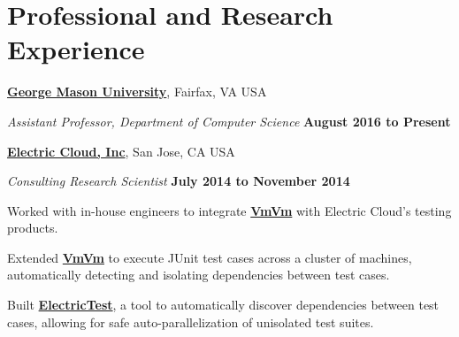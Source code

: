 \documentclass[10pt]{article}
\begin{document}
\begin{outerlist}
\end{outerlist}



\section{Professional and Research Experience}

\href{http://cs.gmu.edu/}{\textbf{George Mason University}},
Fairfax, VA USA
\begin{outerlist}
\item[] \textit{Assistant Professor, Department of Computer Science}%
    \hfill \textbf{August 2016 to Present}

\end{outerlist}

\halfblankline


\href{http://www.electric-cloud.com/}{\textbf{Electric Cloud, Inc}},
San Jose, CA USA
\begin{outerlist}
\item[] \textit{Consulting Research Scientist}%
    \hfill \textbf{July 2014 to November 2014}%
    \begin{innerlist}
    \item Worked with in-house engineers to integrate \href{http://jonbell.net/publications/vmvm}{\textbf{VmVm}} with Electric Cloud's testing products.
           \item Extended  \href{http://jonbell.net/publications/vmvm}{\textbf{VmVm}} to execute JUnit test cases across a cluster of machines, automatically detecting and isolating dependencies between test cases.
            \item Built  \href{http://jonbell.net/publications/electrictest}{\textbf{ElectricTest}}, a tool to automatically discover dependencies between test cases, allowing for safe auto-parallelization of unisolated test suites.
        \end{innerlist}

\end{outerlist}
\end{document}
